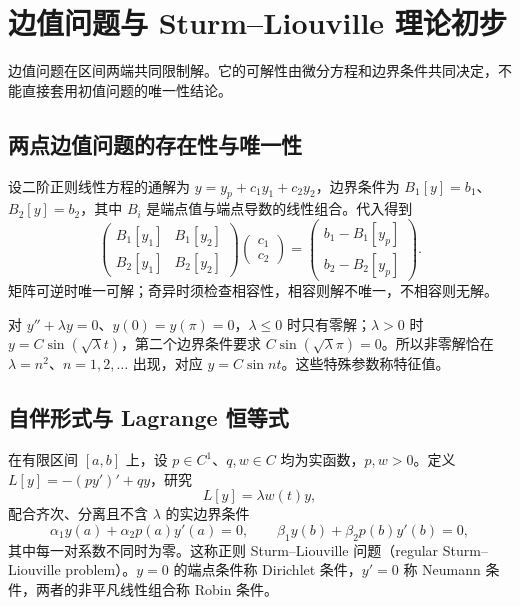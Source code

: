 \documentclass[UTF8,12pt,a4paper,fontset=fandol]{ctexbook}
\begin{document}
\chapter{边值问题与 Sturm--Liouville 理论初步}
\label{chap:ode-boundary}

边值问题在区间两端共同限制解。它的可解性由微分方程和边界条件共同决定，不能直接套用初值问题的唯一性结论。

\section{两点边值问题的存在性与唯一性}
设二阶正则线性方程的通解为 $y=y_p+c_1y_1+c_2y_2$，边界条件为 $B_1[y]=b_1$、$B_2[y]=b_2$，其中 $B_i$ 是端点值与端点导数的线性组合。代入得到
\[
 \begin{pmatrix}B_1[y_1]&B_1[y_2]\\B_2[y_1]&B_2[y_2]\end{pmatrix}
 \begin{pmatrix}c_1\\c_2\end{pmatrix}
 =\begin{pmatrix}b_1-B_1[y_p]\\b_2-B_2[y_p]\end{pmatrix}.
\]
矩阵可逆时唯一可解；奇异时须检查相容性，相容则解不唯一，不相容则无解。

\begin{example}
对 $y''+\lambda y=0$、$y(0)=y(\pi)=0$，$\lambda\leq0$ 时只有零解；$\lambda>0$ 时 $y=C\sin(\sqrt\lambda t)$，第二个边界条件要求 $C\sin(\sqrt\lambda\pi)=0$。所以非零解恰在 $\lambda=n^2$、$n=1,2,\ldots$ 出现，对应 $y=C\sin nt$。这些特殊参数称特征值。
\end{example}

\section{自伴形式与 Lagrange 恒等式}
在有限区间 $[a,b]$ 上，设 $p\in C^1$、$q,w\in C$ 均为实函数，$p,w>0$。定义 $L[y]=-(py')'+qy$，研究
\begin{equation}
 L[y]=\lambda w(t)y,
 \label{eq:ode-sturm-liouville}
\end{equation}
配合齐次、分离且不含 $\lambda$ 的实边界条件
\[
 \alpha_1y(a)+\alpha_2p(a)y'(a)=0,\qquad
 \beta_1y(b)+\beta_2p(b)y'(b)=0,
\]
其中每一对系数不同时为零。这称正则 Sturm--Liouville 问题（regular Sturm--Liouville problem）。$y=0$ 的端点条件称 Dirichlet 条件，$y'=0$ 称 Neumann 条件，两者的非平凡线性组合称 Robin 条件。
\end{document}
